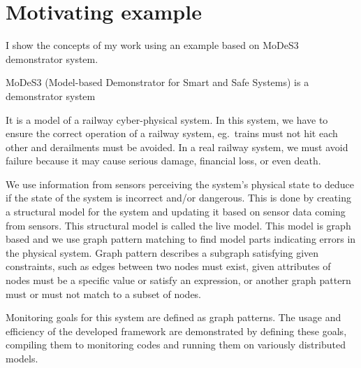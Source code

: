 \chapter{Motivating example}


I show the concepts of my work using an example based on MoDeS3~\cite{modes3} demonstrator system. 

MoDeS3 (Model-based Demonstrator for Smart and Safe Systems) is a demonstrator system 


It is a model of a railway cyber-physical system. In this system, we have to ensure the correct operation of a railway system, eg.\ trains must not hit each other and derailments must be avoided. In a real railway system, we must avoid failure because it may cause serious damage, financial loss, or even death.

We use information from sensors perceiving the system's physical state to deduce if the state of the system is incorrect and/or dangerous. This is done by creating a structural model for the system and updating it based on sensor data coming from sensors. This structural model is called the live model. This model is graph based and we use graph pattern matching to find model parts indicating errors in the physical system. Graph pattern describes a subgraph satisfying given constraints, such as edges between two nodes must exist, given attributes of nodes must be a specific value or satisfy an expression, or another graph pattern must or must not match to a subset of nodes.

Monitoring goals for this system are defined as graph patterns. The usage and efficiency of the developed framework are demonstrated by defining these goals, compiling them to monitoring codes and running them on variously distributed models.

 



